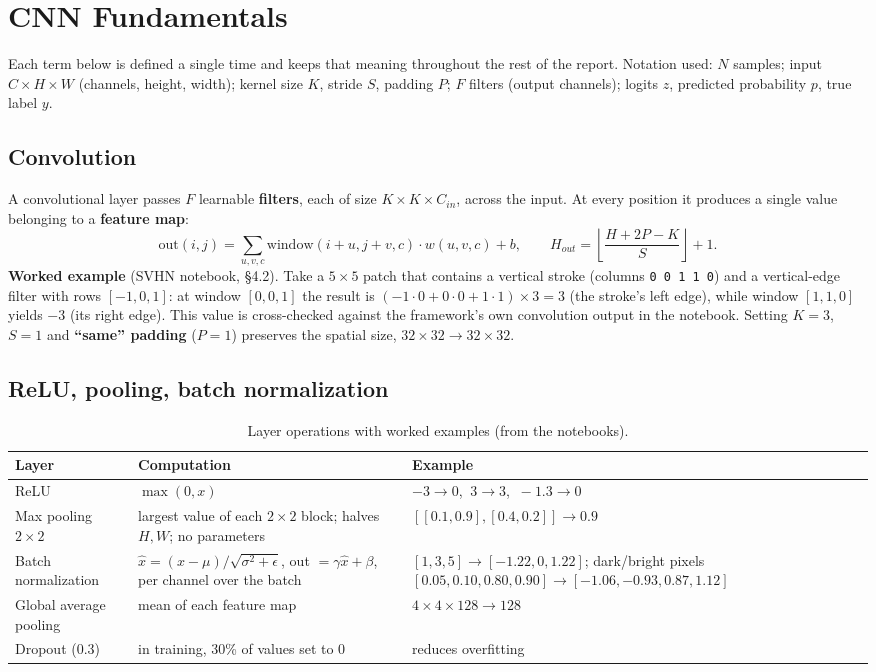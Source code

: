 \documentclass[11pt, a4paper]{article}
\begin{document}
\section{CNN Fundamentals}

Each term below is defined a single time and keeps that meaning throughout the rest of the report.
Notation used: $N$ samples; input $C\times H\times W$ (channels, height, width); kernel size $K$, stride $S$,
padding $P$; $F$ filters (output channels); logits $z$, predicted probability $p$, true label $y$.

\subsection{Convolution}
A convolutional layer passes $F$ learnable \textbf{filters}, each of size $K\times K\times C_{in}$, across the input.
At every position it produces a single value belonging to a \textbf{feature map}:
\[
\text{out}(i,j) = \sum_{u,v,c} \text{window}(i{+}u, j{+}v, c)\cdot w(u,v,c) + b,
\qquad H_{out} = \left\lfloor \frac{H + 2P - K}{S} \right\rfloor + 1 .
\]
\textbf{Worked example} (SVHN notebook, \S4.2). Take a $5\times5$ patch that contains a vertical stroke (columns
\texttt{0 0 1 1 0}) and a vertical-edge filter with rows $[-1, 0, 1]$: at window $[0,0,1]$ the result is
$(-1\cdot0 + 0\cdot0 + 1\cdot1)\times 3 = 3$ (the stroke's left edge), while window $[1,1,0]$ yields $-3$ (its right
edge). This value is cross-checked against the framework's own convolution output in the notebook.
Setting $K=3$, $S=1$ and \textbf{``same'' padding} ($P=1$) preserves the spatial size, $32\times32 \to 32\times32$.

\subsection{ReLU, pooling, batch normalization}
\begin{table}[H]
\centering
\caption{Layer operations with worked examples (from the notebooks).}
\small
\begin{tabular}{p{3.2cm}p{5.6cm}p{5.8cm}}
\toprule
Layer & Computation & Example \\
\midrule
ReLU & $\max(0, x)$ & $-3 \to 0$, $\ 3 \to 3$, $\ -1.3 \to 0$ \\
Max pooling $2\times2$ & largest value of each $2\times2$ block; halves $H, W$; no parameters & $[[0.1, 0.9],[0.4, 0.2]] \to 0.9$ \\
Batch normalization & $\hat{x} = (x-\mu)/\sqrt{\sigma^2+\epsilon}$, out $= \gamma\hat{x}+\beta$, per channel over the batch & $[1,3,5] \to [-1.22, 0, 1.22]$; dark/bright pixels $[0.05, 0.10, 0.80, 0.90] \to [-1.06, -0.93, 0.87, 1.12]$ \\
Global average pooling & mean of each feature map & $4\times4\times128 \to 128$ \\
Dropout (0.3) & in training, 30\% of values set to 0 & reduces overfitting \\
\bottomrule
\end{tabular}
\end{table}
\end{document}
